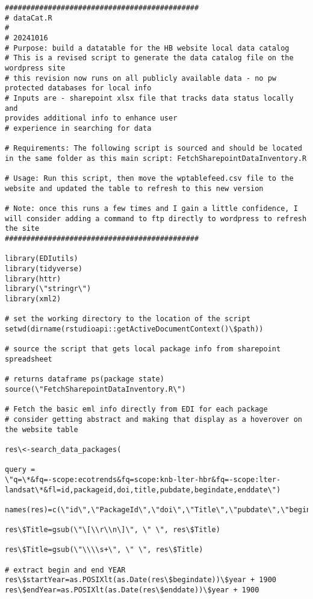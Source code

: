 \documentclass[
  letterpaper,
  DIV=11,
  numbers=noendperiod]{scrreprt}
\begin{document}
\begin{verbatim}
#############################################
# dataCat.R
#
# 20241016
# Purpose: build a datatable for the HB website local data catalog
# This is a revised script to generate the data catalog file on the
wordpress site
# this revision now runs on all publicly available data - no pw
protected databases for local info
# Inputs are - sharepoint xlsx file that tracks data status locally and
provides additional info to enhance user
# experience in searching for data

# Requirements: The following script is sourced and should be located
in the same folder as this main script: FetchSharepointDataInventory.R

# Usage: Run this script, then move the wptablefeed.csv file to the
website and updated the table to refresh to this new version

# Note: once this runs a few times and I gain a little confidence, I
will consider adding a command to ftp directly to wordpress to refresh
the site
#############################################

library(EDIutils)
library(tidyverse)
library(httr)
library(\"stringr\")
library(xml2)

# set the working directory to the location of the script
setwd(dirname(rstudioapi::getActiveDocumentContext()\$path))

# source the script that gets local package info from sharepoint
spreadsheet

# returns dataframe ps(package state)
source(\"FetchSharepointDataInventory.R\")

# Fetch the basic eml info directly from EDI for each package
# consider getting abstract and making that display as a hoverover on
the website table

res\<-search_data_packages(

query =
\"q=\*&fq=-scope:ecotrends&fq=scope:knb-lter-hbr&fq=-scope:lter-landsat\*&fl=id,packageid,doi,title,pubdate,begindate,enddate\")

names(res)=c(\"id\",\"PackageId\",\"doi\",\"Title\",\"pubdate\",\"begindate\",\"enddate\")

res\$Title=gsub(\"\[\\r\\n\]\", \" \", res\$Title)

res\$Title=gsub(\"\\\\s+\", \" \", res\$Title)

# extract begin and end YEAR
res\$startYear=as.POSIXlt(as.Date(res\$begindate))\$year + 1900
res\$endYear=as.POSIXlt(as.Date(res\$enddate))\$year + 1900


\end{verbatim}
\end{document}
